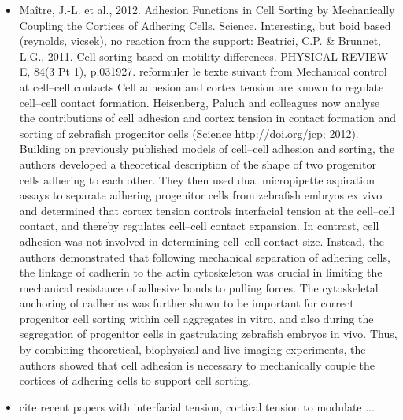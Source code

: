 \begin{itemize}
	\item Maître, J.-L. et al., 2012. Adhesion Functions in Cell Sorting by Mechanically Coupling the Cortices of Adhering Cells. Science. \cite{Maitre:2012cma}    Interesting, but boid based (reynolds, vicsek), no reaction from the support: Beatrici, C.P. & Brunnet, L.G., 2011. Cell sorting based on motility differences. PHYSICAL REVIEW E, 84(3 Pt 1), p.031927. \cite{Beatrici:2011vr}     reformuler le texte suivant from Mechanical control at cell–cell contacts  Cell adhesion and cortex tension are known to regulate cell–cell contact formation. Heisenberg, Paluch and colleagues now analyse the contributions of cell adhesion and cortex tension in contact formation and sorting of zebrafish progenitor cells (Science http://doi.org/jcp; 2012).  Building on previously published models of cell–cell adhesion and sorting, the authors developed a theoretical description of the shape of two progenitor cells adhering to each other. They then used dual micropipette aspiration assays to separate adhering progenitor cells from zebrafish embryos ex vivo and determined that cortex tension controls interfacial tension at the cell–cell contact, and thereby regulates cell–cell contact expansion. In contrast, cell adhesion was not involved in determining cell–cell contact size. Instead, the authors demonstrated that following mechanical separation of adhering cells, the linkage of cadherin to the actin cytoskeleton was crucial in limiting the mechanical resistance of adhesive bonds to pulling forces. The cytoskeletal anchoring of cadherins was further shown to be important for correct progenitor cell sorting within cell aggregates in vitro, and also during the segregation of progenitor cells in gastrulating zebrafish embryos in vivo. Thus, by combining theoretical, biophysical and live imaging experiments, the authors showed that cell adhesion is necessary to mechanically couple the cortices of adhering cells to support cell sorting.        
	\item cite recent papers with interfacial tension, cortical tension to modulate ...
\end{itemize}

